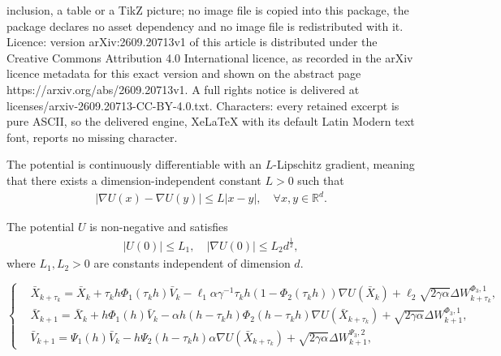 \documentclass[10pt,a4paper]{amsart}
\begin{document}
inclusion, a table or a TikZ picture; no image file is copied into this package, the package declares no asset dependency and no image file is redistributed with it. Licence: version arXiv:2609.20713v1 of this article is distributed under the Creative Commons Attribution 4.0 International licence, as recorded in the arXiv licence metadata for this exact version and shown on the abstract page https://arxiv.org/abs/2609.20713v1. A full rights notice is delivered at licenses/arxiv-2609.20713-CC-BY-4.0.txt. Characters: every retained excerpt is pure ASCII, so the delivered engine, XeLaTeX with its default Latin Modern text font, reports no missing character.
\begin{assumption}\label{as:Lip}
The potential is continuously differentiable with an $L$-Lipschitz gradient, meaning that there exists a dimension-independent constant $L > 0$ such that
\begin{align}\label{eq:lip}
    |\nabla U(x) - \nabla U(y)| \leq L |x - y|,
    \quad 
    \forall
    x, y \in
    \mathbb{R}^d.
    \end{align}
\end{assumption}

\begin{assumption}\label{as:U_0-bound}
The potential $U$ is non-negative and satisfies 
\begin{align}
|U(0)|
\leq 
L_1, 
\quad 
|\nabla U(0)|
\leq 
L_2 d^{\frac{1}{2}},
\end{align}
where $L_1, L_2 > 0$ are constants independent of dimension $d$.
\end{assumption}

\begin{equation}
\label{eq:uni-process}
\left\{
\begin{aligned}
&\bar{X}_{k+\tau_k}
=
\bar{X}_k
+ 
\tau_k h\Phi_1(\tau_kh)\bar{V}_k
-
\ell_1 \alpha \gamma^{-1}
\tau_k h 
(1-\Phi_2(\tau_k h))
\nabla U (\bar{X}_k)
+
\ell_2\sqrt{2\gamma \alpha}
\Delta W_{k+\tau_k}^{\Phi_3,1}, \\
&\bar{X}_{k+1}
=
\bar{X}_k
+
h\Phi_1(h)\bar{V}_k
-
\alpha 
h(h-\tau_k h)\Phi_2(h-\tau_kh)\nabla U(\bar{X}_{k+\tau_k})
+
\sqrt{2\gamma \alpha}
\Delta W_{k+1}^{\Phi_3,1},\\
&\bar{V}_{k+1}
=
\Psi_1(h)\bar{V}_k
-
h\Psi_2(h-\tau_k h)\alpha
\nabla U(\bar{X}_{k+\tau_k})
+
\sqrt{2\gamma\alpha}
\Delta W_{k+1}^{\Psi_3,2},
\end{aligned}
\right.
\end{equation}
\end{document}
